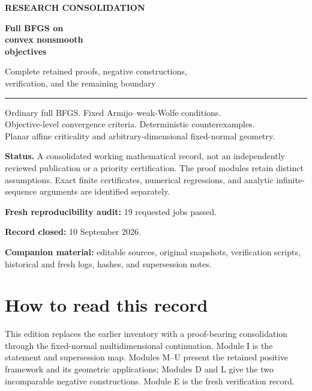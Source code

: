 \documentclass[10pt,oneside,openany]{book}
\theoremstyle{remark}\newtheorem{remark}{Remark}[chapter]
\begin{document}
\begin{titlepage}
\color{Ink}
{\large\sffamily\bfseries RESEARCH CONSOLIDATION}\par
\vspace{22mm}
{\Huge\bfseries Full BFGS on\\[3mm]convex nonsmooth\\[3mm]objectives}\par
\vspace{10mm}
{\Large Complete retained proofs, negative constructions,\\verification, and the remaining boundary}\par
\vspace{15mm}
{\color{Accent}\rule{\textwidth}{1.2pt}}\par
\vspace{7mm}
\begin{minipage}{.94\textwidth}
\large
Ordinary full BFGS. Fixed Armijo--weak-Wolfe conditions.\\
Objective-level convergence criteria. Deterministic counterexamples.\\
Planar affine criticality and arbitrary-dimensional fixed-normal geometry.
\end{minipage}
\vfill
\begin{minipage}{.94\textwidth}
\normalsize
\textbf{Status.} A consolidated working mathematical record, not an independently reviewed publication or a priority certification. The proof modules retain distinct assumptions. Exact finite certificates, numerical regressions, and analytic infinite-sequence arguments are identified separately.\par
\vspace{5mm}
\textbf{Fresh reproducibility audit:} 19 requested jobs passed.\par
\textbf{Record closed:} 10 September 2026.\par
\textbf{Companion material:} editable sources, original snapshots, verification scripts, historical and fresh logs, hashes, and supersession notes.
\end{minipage}
\end{titlepage}
\frontmatter
\chapter*{How to read this record}
This edition replaces the earlier inventory with a proof-bearing consolidation through the fixed-normal multidimensional continuation. Module I is the statement and supersession map. Modules M--U present the retained positive framework and its geometric applications; Modules D and L give the two incomparable negative constructions. Module E is the fresh verification record.
\end{document}
